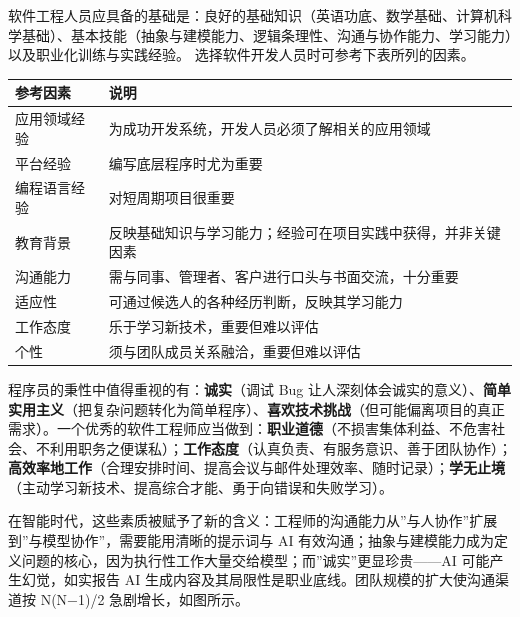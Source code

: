 \documentclass[12pt,a4paper,twoside,openany]{ctexbook}
\numberwithin{figure}{chapter}
\numberwithin{table}{chapter}
\newcounter{none}
\begin{document}
软件工程人员应具备的基础是：良好的基础知识（英语功底、数学基础、计算机科学基础）、基本技能（抽象与建模能力、逻辑条理性、沟通与协作能力、学习能力）以及职业化训练与实践经验。
选择软件开发人员时可参考下表所列的因素。

{\def\LTcaptype{none} %
\begin{longtable}[]{@{}
  >{\raggedright\arraybackslash}p{}
  >{\raggedright\arraybackslash}p{}@{}}
\toprule\noalign{}
\begin{minipage}[b]{\linewidth}\raggedright
参考因素
\end{minipage} & \begin{minipage}[b]{\linewidth}\raggedright
说明
\end{minipage} \\
\midrule\noalign{}
\endhead
\bottomrule\noalign{}
\endlastfoot
应用领域经验 & 为成功开发系统，开发人员必须了解相关的应用领域 \\
平台经验 & 编写底层程序时尤为重要 \\
编程语言经验 & 对短周期项目很重要 \\
教育背景 &
反映基础知识与学习能力；经验可在项目实践中获得，并非关键因素 \\
沟通能力 & 需与同事、管理者、客户进行口头与书面交流，十分重要 \\
适应性 & 可通过候选人的各种经历判断，反映其学习能力 \\
工作态度 & 乐于学习新技术，重要但难以评估 \\
个性 & 须与团队成员关系融洽，重要但难以评估 \\
\end{longtable}
}

程序员的秉性中值得重视的有：\textbf{诚实}（调试 Bug
让人深刻体会诚实的意义）、\textbf{简单实用主义}（把复杂问题转化为简单程序）、\textbf{喜欢技术挑战}（但可能偏离项目的真正需求）。一个优秀的软件工程师应当做到：\textbf{职业道德}（不损害集体利益、不危害社会、不利用职务之便谋私）；\textbf{工作态度}（认真负责、有服务意识、善于团队协作）；\textbf{高效率地工作}（合理安排时间、提高会议与邮件处理效率、随时记录）；\textbf{学无止境}（主动学习新技术、提高综合才能、勇于向错误和失败学习）。

在智能时代，这些素质被赋予了新的含义：工程师的沟通能力从''与人协作''扩展到''与模型协作''，需要能用清晰的提示词与
AI
有效沟通；抽象与建模能力成为定义问题的核心，因为执行性工作大量交给模型；而''诚实''更显珍贵------AI
可能产生幻觉，如实报告 AI
生成内容及其局限性是职业底线。团队规模的扩大使沟通渠道按 N(N−1)/2
急剧增长，如图所示。
\end{document}
